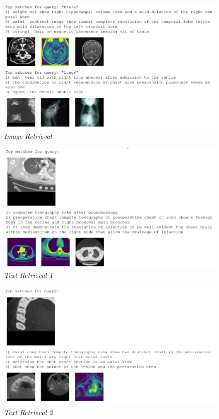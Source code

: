 \documentclass[10pt,twocolumn,letterpaper]{article}
\begin{document}
\begin{figure}[H]
    \centering
    \includegraphics[width=1\linewidth]{img/T2I_test1.png}
    \caption{\textit{Image Retrieval}}
\end{figure}

\begin{figure}[H]
   \centering
   \includegraphics[width=1\linewidth]{img/I2T_test1.png}
   \caption{\textit{Text Retrieval 1}}
\end{figure}
\begin{figure}[H]
   \centering
   \includegraphics[width=1\linewidth]{img/I2T_test2.png}
   \caption{\textit{Text Retrieval 2}}
\end{figure}
\end{document}
